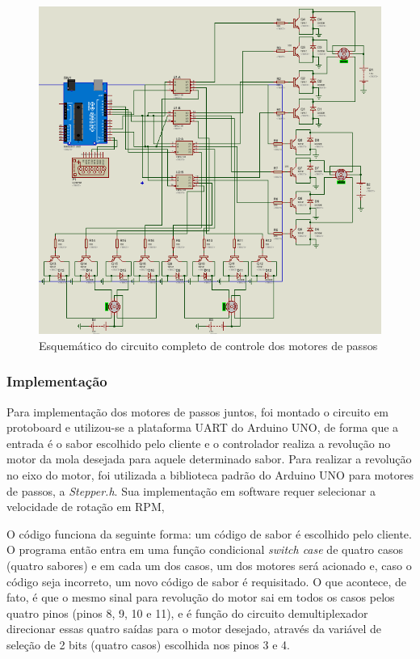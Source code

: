 \begin{figure}[H]
\centering
\includegraphics[width=\textwidth]{figuras/motor_completo}
 \caption{Esquemático do circuito completo de controle dos motores de passos}
\label{fig:motor_completo}
\end{figure}

\subsubsection{Implementação}

Para implementação dos motores de passos juntos, foi montado o circuito em protoboard e utilizou-se a plataforma UART do Arduino UNO, de forma que a entrada é o sabor escolhido pelo cliente e o controlador realiza a revolução no motor da mola desejada para aquele determinado sabor. Para realizar a revolução no eixo do motor, foi utilizada a biblioteca padrão do Arduino UNO para motores de passos, a \textit{Stepper.h}. Sua implementação em software requer selecionar a velocidade de rotação em RPM,

O código funciona da seguinte forma: um código de sabor é escolhido pelo cliente. O programa então entra em uma função condicional \textit{switch case} de quatro casos (quatro sabores) e em cada um dos casos, um dos motores será acionado e, caso o código seja incorreto, um novo código de sabor é requisitado. O que acontece, de fato, é que o mesmo sinal para revolução do motor sai em todos os casos pelos quatro pinos (pinos 8, 9, 10 e 11), e é função do circuito demultiplexador direcionar essas quatro saídas para o motor desejado, através da variável de seleção de 2 bits (quatro casos) escolhida nos pinos 3 e 4.



